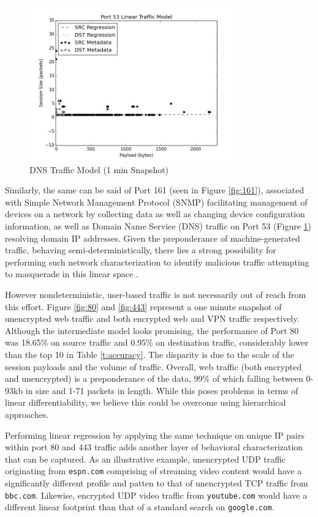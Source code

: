 \begin{figure}[!htb]
	\centering
	\includegraphics[width=9cm]{paperplots/53.png}
	\caption{DNS Traffic Model (1 min Snapshot)}
	\label{fig:53}
\end{figure}

Similarly, the same can be said of Port 161 (seen in Figure \ref{fig:161}), associated with Simple Network Management Protocol (SNMP) facilitating management of devices on a network by collecting data as well as changing device configuration information, as well as Domain Name Service (DNS) traffic on Port 53 (Figure \ref{fig:53}) resolving domain IP addresses. Given the preponderance of machine-generated traffic, behaving semi-deterministically, there lies a strong possibility for performing such network characterization to identify malicious traffic attempting to masquerade in this linear space \cite{7033254}.





However nondeterministic, user-based traffic is not necessarily out of reach from this effort. Figure \ref{fig:80} and \ref{fig:443} represent a one minute snapshot of unencrypted web traffic and both encrypted web and VPN traffic respectively. Although the intermediate model looks promising, the performance of Port 80 was 18.65\% on source traffic and 0.95\% on destination traffic, considerably lower than the top 10 in Table \ref{t:accuracy}. The disparity is due to the scale of the session payloads and the volume of traffic. Overall, web traffic (both encrypted and unencrypted) is a preponderance of the data, 99\% of which falling between 0-93kb in size and 1-71 packets in length. While this poses problems in terms of linear differentiability, we believe this could be overcome using hierarchical approaches.

Performing linear regression by applying the same technique on unique IP pairs within port 80 and 443 traffic adds another layer of behavioral characterization that can be captured. As an illustrative example, unencrypted UDP traffic originating from \texttt{espn.com} comprising of streaming video content would have a significantly different profile and patten to that of unencrypted TCP traffic from \texttt{bbc.com}. Likewise, encrypted UDP video traffic from \texttt{youtube.com} would have a different linear footprint than that of a standard search on \texttt{google.com}.

